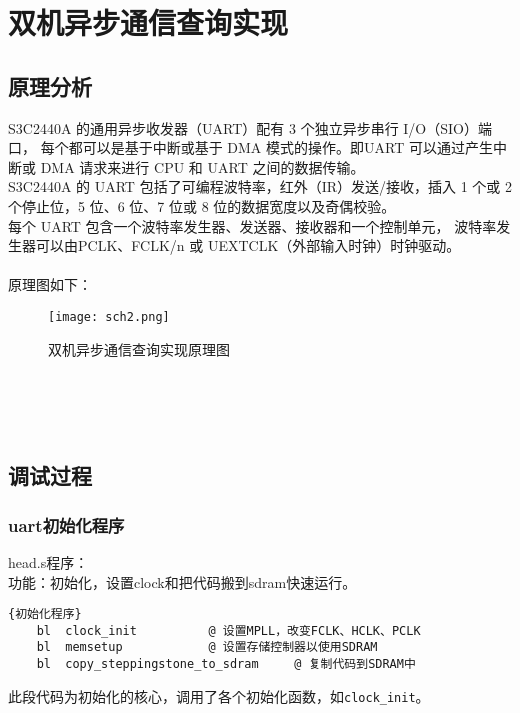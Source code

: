 \section{双机异步通信查询实现}
\subsection{原理分析}
S3C2440A 的通用异步收发器（UART）配有 3 个独立异步串行 I/O（SIO）端口，
每个都可以是基于中断或基于 DMA 模式的操作。即UART 可以通过产生中断或 DMA 
请求来进行 CPU 和 UART 之间的数据传输。\\
S3C2440A 的 UART 包括了可编程波特率，红外（IR）发送/接收，插入 1 个或 2 
个停止位，5 位、6 位、7 位或 8 位的数据宽度以及奇偶校验。\\
每个 UART 包含一个波特率发生器、发送器、接收器和一个控制单元，
波特率发生器可以由PCLK、FCLK/n 或 UEXTCLK（外部输入时钟）时钟驱动。\\
\\
原理图如下：\\
\begin{figure}[htbp]
  \centering
  \texttt{[image: sch2.png]}
  \caption{双机异步通信查询实现原理图}
\end{figure}
\\
\\
\\

\subsection{调试过程}
\subsubsection{uart初始化程序}
head.s程序：\\
功能：初始化，设置clock和把代码搬到sdram快速运行。\\
\lstset{language=bash}
\begin{lstlisting}{初始化程序}
    bl  clock_init          @ 设置MPLL，改变FCLK、HCLK、PCLK
    bl  memsetup            @ 设置存储控制器以使用SDRAM
    bl  copy_steppingstone_to_sdram     @ 复制代码到SDRAM中
\end{lstlisting}
此段代码为初始化的核心，调用了各个初始化函数，如\lstinline{clock_init}。

